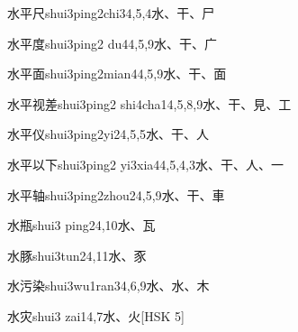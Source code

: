 \begin{entry}{水平尺}{shui3ping2chi3}{4,5,4}{⽔、⼲、⼫}
\end{entry}

\begin{entry}{水平度}{shui3ping2 du4}{4,5,9}{⽔、⼲、⼴}
\end{entry}

\begin{entry}{水平面}{shui3ping2mian4}{4,5,9}{⽔、⼲、⾯}
\end{entry}

\begin{entry}{水平视差}{shui3ping2 shi4cha1}{4,5,8,9}{⽔、⼲、⾒、⼯}
\end{entry}

\begin{entry}{水平仪}{shui3ping2yi2}{4,5,5}{⽔、⼲、⼈}
\end{entry}

\begin{entry}{水平以下}{shui3ping2 yi3xia4}{4,5,4,3}{⽔、⼲、⼈、⼀}
\end{entry}

\begin{entry}{水平轴}{shui3ping2zhou2}{4,5,9}{⽔、⼲、⾞}
\end{entry}

\begin{entry}{水瓶}{shui3 ping2}{4,10}{⽔、⽡}
\end{entry}

\begin{entry}{水豚}{shui3tun2}{4,11}{⽔、⾗}
\end{entry}

\begin{entry}{水污染}{shui3wu1ran3}{4,6,9}{⽔、⽔、⽊}
\end{entry}

\begin{entry}{水灾}{shui3 zai1}{4,7}{⽔、⽕}[HSK 5]
\end{entry}

